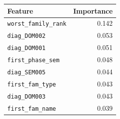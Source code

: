 \begin{tabular}{lr}
\toprule
\textbf{Feature} & \textbf{Importance}\\
\midrule
\texttt{worst\_family\_rank} & 0.142\\
\texttt{diag\_DOM002} & 0.053\\
\texttt{diag\_DOM001} & 0.051\\
\texttt{first\_phase\_sem} & 0.048\\
\texttt{diag\_SEM005} & 0.044\\
\texttt{first\_fam\_type} & 0.043\\
\texttt{diag\_DOM003} & 0.043\\
\texttt{first\_fam\_name} & 0.039\\\bottomrule
\end{tabular}
